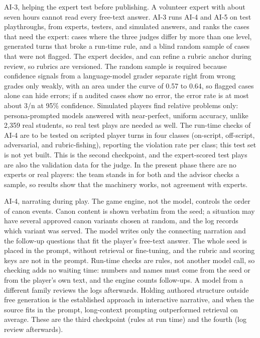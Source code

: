 AI-3, helping the expert test before publishing. A volunteer expert with about seven hours cannot read every free-text answer. AI-3 runs AI-4 and AI-5 on test playthroughs, from experts, testers, and simulated answers, and ranks the cases that need the expert: cases where the three judges differ by more than one level, generated turns that broke a run-time rule, and a blind random sample of cases that were not flagged. The expert decides, and can refine a rubric anchor during review, so rubrics are versioned. The random sample is required because confidence signals from a language-model grader separate right from wrong grades only weakly, with an area under the curve of 0.57 to 0.64\cite{r118}, so flagged cases alone can hide errors; if n audited cases show no error, the error rate is at most about 3/n at 95\% confidence\cite{r119}. Simulated players find relative problems only: persona-prompted models answered with near-perfect, uniform accuracy, unlike 2,359 real students\cite{r120}, so real test plays are needed as well. The run-time checks of AI-4 are to be tested on scripted player turns in four classes (on-script, off-script, adversarial, and rubric-fishing), reporting the violation rate per class; this test set is not yet built. This is the second checkpoint, and the expert-scored test plays are also the validation data for the judge. In the present phase there are no experts or real players: the team stands in for both and the advisor checks a sample, so results show that the machinery works, not agreement with experts.

AI-4, narrating during play. The game engine, not the model, controls the order of canon events. Canon content is shown verbatim from the seed; a situation may have several approved canon variants chosen at random, and the log records which variant was served. The model writes only the connecting narration and the follow-up questions that fit the player's free-text answer. The whole seed is placed in the prompt, without retrieval or fine-tuning, and the rubric and scoring keys are not in the prompt. Run-time checks are rules, not another model call, so checking adds no waiting time: numbers and names must come from the seed or from the player's own text, and the engine counts follow-ups. A model from a different family reviews the logs afterwards. Holding authored structure outside free generation is the established approach in interactive narrative\cite{r121}, and when the source fits in the prompt, long-context prompting outperformed retrieval on average\cite{r122}. These are the third checkpoint (rules at run time) and the fourth (log review afterwards).

